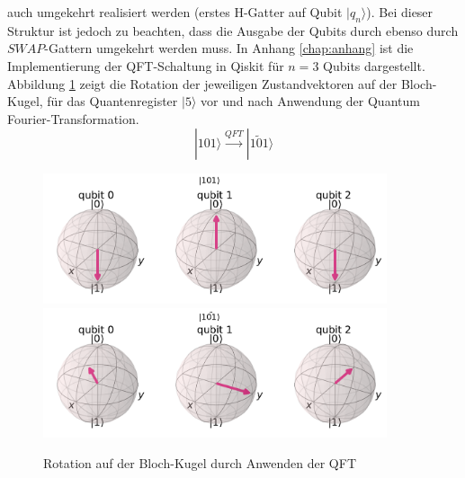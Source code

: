 auch umgekehrt realisiert werden (erstes H-Gatter auf Qubit $|q_n\rangle$). Bei dieser Struktur ist jedoch zu beachten, dass die Ausgabe der Qubits durch ebenso durch $SWAP$-Gattern umgekehrt werden muss.
In Anhang \ref{chap:anhang} ist die Implementierung der QFT-Schaltung in Qiskit f\"ur $n=3$ Qubits dargestellt. Abbildung \ref{fig:QFT-Bloch} zeigt die Rotation der jeweiligen Zustandvektoren auf der Bloch-Kugel, f\"ur das Quantenregister $|5\rangle$ vor und nach Anwendung der Quantum Fourier-Transformation.
\begin{equation}
|101\rangle \xrightarrow{QFT} |\tilde{101}\rangle
\end{equation}

\begin{figure}[h]
\centering
\includegraphics[width=0.9\textwidth]{figures/qft_init.pdf}
\bigbreak
\includegraphics[width=0.9\textwidth]{figures/qft_applied.pdf}
\caption{Rotation auf der Bloch-Kugel durch Anwenden der QFT}
\label{fig:QFT-Bloch}
\end{figure}
